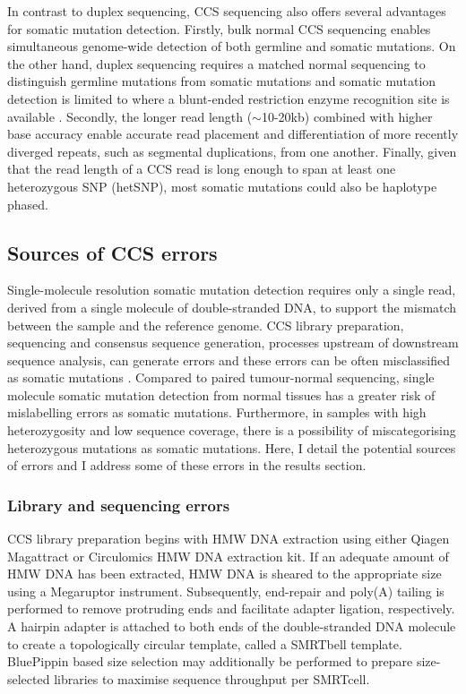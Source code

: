 In contrast to duplex sequencing, CCS sequencing also offers several advantages for somatic mutation detection. Firstly, bulk normal CCS sequencing enables simultaneous genome-wide detection of both germline and somatic mutations. On the other hand, duplex sequencing requires a matched normal sequencing to distinguish germline mutations from somatic mutations and somatic mutation detection is limited to where a blunt-ended restriction enzyme recognition site is available \cite{Abascal2021-pk}. Secondly, the longer read length ($\sim$10-20kb) combined with higher base accuracy enable accurate read placement and differentiation of more recently diverged repeats, such as segmental duplications, from one another. Finally, given that the read length of a CCS read is long enough to span at least one heterozygous SNP (hetSNP), most somatic mutations could also be haplotype phased. 

\subsection{Sources of CCS errors}

Single-molecule resolution somatic mutation detection requires only a single read, derived from a single molecule of double-stranded DNA, to support the mismatch between the sample and the reference genome. CCS library preparation, sequencing and consensus sequence generation, processes upstream of downstream sequence analysis, can generate errors and these errors can be often misclassified as somatic mutations \cite{Cibulskis2013-gw}. Compared to paired tumour-normal sequencing, single molecule somatic mutation detection from normal tissues has a greater risk of mislabelling errors as somatic mutations. Furthermore, in samples with high heterozygosity and low sequence coverage, there is a possibility of miscategorising heterozygous mutations as somatic mutations. Here, I detail the potential sources of errors and I address some of these errors in the results section.

\subsubsection{Library and sequencing errors}

CCS library preparation begins with HMW DNA extraction using either Qiagen Magattract or Circulomics HMW DNA extraction kit. If an adequate amount of HMW DNA has been extracted, HMW DNA is sheared to the appropriate size using a Megaruptor instrument. Subsequently, end-repair and poly(A) tailing is performed to remove protruding ends and facilitate adapter ligation, respectively. A hairpin adapter is attached to both ends of the double-stranded DNA molecule to create a topologically circular template, called a SMRTbell template. BluePippin based size selection may additionally be performed to prepare size-selected libraries to maximise sequence throughput per SMRTcell. 

